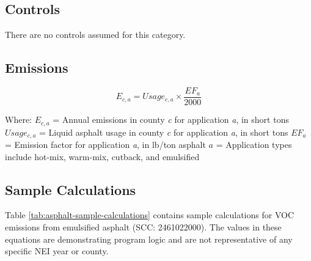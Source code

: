 \documentclass[
  11pt,
  oneside]{book}
\begin{document}
\subsection{Controls}\label{controls-1}

There are no controls assumed for this category.

\subsection{Emissions}\label{emissions-1}

\begin{equation} 
  E_{c,a} = Usage_{c,a} \times \frac{EF_{a}}{2000}
  \label{eq:asphalt-emissions}
\end{equation}

Where: \newline
\(E_{c,a}\) = Annual emissions in county \emph{c} for application \emph{a}, in short tons \newline
\(Usage_{c,a}\) = Liquid asphalt usage in county \emph{c} for application \emph{a}, in short tons \newline
\(EF_{a}\) = Emission factor for application \emph{a}, in lb/ton asphalt \newline
\(a\) = Application types include hot-mix, warm-mix, cutback, and emulsified \newline

\subsection{Sample Calculations}\label{sample-calculations-1}

Table \ref{tab:asphalt-sample-calculations} contains sample calculations for VOC emissions from emulsified asphalt (SCC: 2461022000). The values in these equations are demonstrating program logic and are not representative of any specific NEI year or county.

\begin{table}
\centering
\caption{\label{tab:asphalt-sample-calculations}Sample Calculations}
\centering
{}
\end{table}
\end{document}
